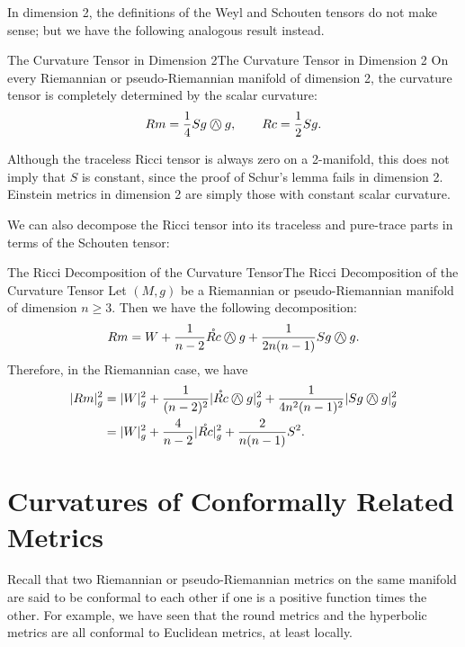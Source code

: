 \documentclass[../main.tex]{subfiles}
\begin{document}
In dimension 2, the definitions of the Weyl and Schouten tensors do not make sense; but we have the following analogous result instead.

\begin{corollary}{The Curvature Tensor in Dimension 2}{The Curvature Tensor in Dimension 2}
	On every Riemannian or pseudo-Riemannian manifold of dimension 2, the curvature tensor is completely determined by the scalar curvature:
	\begin{equation}
		Rm = \frac{1}{4} S g \owedge g, \qquad Rc = \frac{1}{2} S g.
	\end{equation}
\end{corollary}

\begin{remark}
	Although the traceless Ricci tensor is always zero on a 2-manifold, this does not imply that $S$ is constant, since the proof of Schur’s lemma fails in dimension 2. Einstein metrics in dimension 2 are simply those with constant scalar curvature.
\end{remark}

We can also decompose the Ricci tensor into its traceless and pure-trace parts in terms of the Schouten tensor:
\begin{proposition}{The Ricci Decomposition of the Curvature Tensor}{The Ricci Decomposition of the Curvature Tensor}
	Let $(M, g)$ be a Riemannian or pseudo-Riemannian manifold of dimension $n \geq 3$. Then we have the following decomposition:
	\begin{equation}
		Rm = W + \frac{1}{n-2} \mathring{Rc} \owedge g + \frac{1}{2n(n-1)} S g \owedge g.
	\end{equation}
	Therefore, in the Riemannian case, we have
	\begin{equation}
		\begin{aligned}
			|Rm|_g^2 &= |W|_g^2 + \frac{1}{(n-2)^2} |\mathring{Rc} \owedge g|_g^2 + \frac{1}{4n^2(n-1)^2} |S g \owedge g|_g^2 \\
							 &= |W|_g^2 + \frac{4}{n-2} |\mathring{Rc}|_g^2 + \frac{2}{n(n-1)} S^2.
		\end{aligned}
	\end{equation}
\end{proposition}

\section{Curvatures of Conformally Related Metrics}
Recall that two Riemannian or pseudo-Riemannian metrics on the same manifold are said to be conformal to each other if one is a positive function times the other. For example, we have seen that the round metrics and the hyperbolic metrics are all conformal to Euclidean metrics, at least locally.
\end{document}
